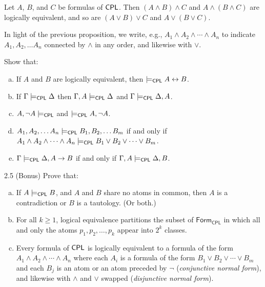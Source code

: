 \documentclass{article}
\begin{document}
\begin{proposition}
    Let $A$, $B$, and $C$ be formulas of $\mathsf{CPL}$. Then $(A \wedge B) \wedge C$ and $A \wedge (B \wedge C)$ are logically equivalent, and so are $(A \vee B) \vee C$ and $A \vee (B \vee C)$.
\end{proposition}

\begin{notation}
    In light of the previous proposition, we write, e.g., $A_1 \wedge A_2 \wedge \cdots \wedge A_n$ to indicate $A_1, A_2, \dots A_n$ connected by $\wedge$ in any order, and likewise with $\vee$. 
\end{notation}

\begin{prob}{2.4}
    Show that:
    \begin{enumerate}[a)]
    \item If $A$ and $B$ are logically equivalent, then $\models_{\mathsf{CPL}} A \leftrightarrow B$.
    \item If $\Gamma \models_{\mathsf{CPL}} \Delta$ then $\Gamma, A \models_{\mathsf{CPL}} \Delta$ and $\Gamma \models_{\mathsf{CPL}} \Delta, A$.
    \item $A, \neg A \models_{\mathsf{CPL}}$ and $\models_{\mathsf{CPL}} A, \neg A$.
    \item $A_1, A_2, \dots A_n \models_{\mathsf{CPL}} B_1, B_2, \dots B_m$ if and only if $A_1 \wedge A_2 \wedge \cdots \wedge A_n \models_{\mathsf{CPL}} B_1 \vee B_2 \vee \cdots \vee B_m$.
    \item $\Gamma \models_{\mathsf{CPL}} \Delta, A \to B$ if and only if $\Gamma, A \models_{\mathsf{CPL}} \Delta, B$.
    \end{enumerate}
\end{prob}

\begin{prob}{2.5 (Bonus)}
    Prove that:
    \begin{enumerate}[a)]
    \item If $A \models_{\mathsf{CPL}} B$, and $A$ and $B$ share no atoms in common, then $A$ is a contradiction or $B$ is a tautology. (Or both.)
    \item For all $k \geq 1$, logical equivalence partitions the subset of $\mathsf{Form_{CPL}}$ in which all and only the atoms $p_1, p_2, \dots, p_k$ appear into $2^k$ classes.
    \item Every formula of $\mathsf{CPL}$ is logically equivalent to a formula of the form $A_1 \wedge A_2 \wedge \cdots \wedge A_n$ where each $A_i$ is a formula of the form $B_1 \vee B_2 \vee \cdots \vee B_m$ and each $B_j$ is an atom or an atom preceded by $\neg$ (\emph{conjunctive normal form}), and likewise with $\wedge$ and $\vee$ swapped (\emph{disjunctive normal form}).
    \end{enumerate}
\end{prob}
\end{document}
